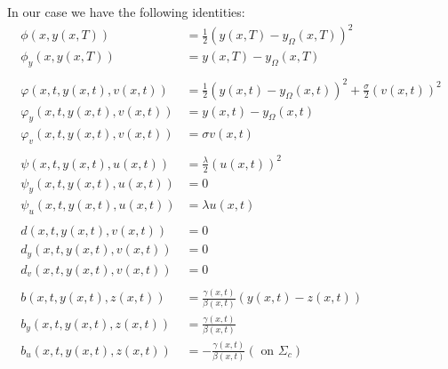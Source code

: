\documentclass[
12pt, %
a4paper, %
onecolumn, %
portrait %
]{article}
\begin{document}
In our case we have the following identities:
\begin{align*}
\phi(x,y(x,T)) & = \frac{1}{2} (y(x,T) - y_{\Omega}(x,T))^2 \\
\phi_y(x,y(x,T)) & = y(x,T) - y_{\Omega}(x,T) \\
\\
\varphi(x,t, y(x,t), v(x,t)) & = \frac{1}{2} (y(x,t) - y_{\Omega}(x,t))^2 + \frac{\sigma}{2} (v(x,t))^2 \\
\varphi_y(x,t,y(x,t), v(x,t)) &= y(x,t) - y_{\Omega}(x,t) \\
\varphi_v(x,t,y(x,t), v(x,t)) &= \sigma v(x,t) \\
\\
\psi(x,t,y(x,t), u(x,t)) &= \frac{\lambda}{2} (u(x,t))^2 \\
\psi_y(x,t,y(x,t), u(x,t)) &= 0 \\
\psi_u(x,t,y(x,t), u(x,t)) &= \lambda u(x,t) \\
\\
d(x,t, y(x,t), v(x,t)) &= 0 \\
d_y(x,t, y(x,t), v(x,t)) &= 0 \\
d_v(x,t, y(x,t), v(x,t)) &= 0 \\
\\
b(x,t, y(x,t), z(x,t)) &= \frac{\gamma(x,t)}{\beta(x,t)} (y(x,t) - z(x,t)) \\
b_y(x,t, y(x,t), z(x,t)) &= \frac{\gamma(x,t)}{\beta(x,t)} \\
b_u(x,t, y(x,t), z(x,t)) &= -\frac{\gamma(x,t)}{\beta(x,t)} (\text{ on } \Sigma_c)
\end{align*}
\end{document}
